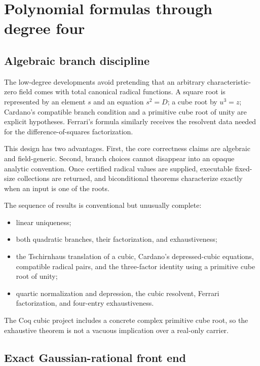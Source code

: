 \documentclass[
  10pt,
  a4paper,
  twoside,
  open=any,
  parskip=half,
  headings=big
]{scrreprt}
\begin{document}
\section{Polynomial formulas through degree four}

\subsection{Algebraic branch discipline}

The low-degree developments avoid pretending that an arbitrary characteristic-zero field comes with total canonical radical functions. A square root is represented by an element \(s\) and an equation \(s^2=D\); a cube root by \(u^3=z\); Cardano's compatible branch condition and a primitive cube root of unity are explicit hypotheses. Ferrari's formula similarly receives the resolvent data needed for the difference-of-squares factorization.

This design has two advantages. First, the core correctness claims are algebraic and field-generic. Second, branch choices cannot disappear into an opaque analytic convention. Once certified radical values are supplied, executable fixed-size collections are returned, and biconditional theorems characterize exactly when an input is one of the roots.

The sequence of results is conventional but unusually complete:

\begin{itemize}
  \item linear uniqueness;
  \item both quadratic branches, their factorization, and exhaustiveness;
  \item the Tschirnhaus translation of a cubic, Cardano's depressed-cubic equations, compatible radical pairs, and the three-factor identity using a primitive cube root of unity;
  \item quartic normalization and depression, the cubic resolvent, Ferrari factorization, and four-entry exhaustiveness.
\end{itemize}

The Coq cubic project includes a concrete complex primitive cube root, so the exhaustive theorem is not a vacuous implication over a real-only carrier.

\subsection{Exact Gaussian-rational front end}
\end{document}
